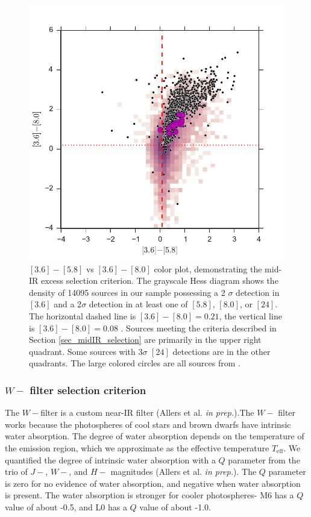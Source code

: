 \documentclass[12pt,preprint]{aastex}
\begin{document}
\begin{figure}[ht!]
  \caption{$[3.6]-[5.8]$ vs $[3.6]-[8.0]$ color plot, demonstrating the mid-IR excess selection criterion.  The grayscale Hess diagram shows the density of 14095 sources in our sample possessing a 2 $\sigma$ detection in $[3.6]$ and a 2$\sigma$ detection in at least one of $[5.8]$, $[8.0]$, or $[24]$.  The horizontal dashed line is $[3.6]-[8.0]=0.21$, the vertical line is $[3.6]-[8.0]=0.08$ \citep{2006ApJ...651..502P}.  Sources meeting the criteria described in Section \ref{sec_midIR_selection} are primarily in the upper right quadrant.  Some sources with 3$\sigma$ $[24]$ detections are in the other quadrants.  The large colored circles are all sources from \citet{allers06}. \label{fig_midIR_selection}}
\centering
\includegraphics[scale=0.6]{figures/disk_selection_allers}
\end{figure}

\subsubsection{$W-$ filter selection criterion}
The $W-$filter is a custom near-IR filter (Allers et al. \emph{in prep.}).The $W-$ filter works because the photospheres of cool stars and brown dwarfs have intrinsic water absorption.  The degree of water absorption depends on the temperature of the emission region, which we approximate as the effective temperature $T_{\mathrm{eff}}$.  We  quantified the degree of intrinsic water absorption with a $Q$ parameter from the trio of $J-$, $W-$, and $H-$ magnitudes (Allers et al. \emph{in prep.}).  The $Q$ parameter is zero for no evidence of water absorption, and negative when water absorption is present.  The water absorption is stronger for cooler photospheres- M6 has a $Q$ value of about -0.5, and L0 has a $Q$ value of about -1.0.  
\end{document}
